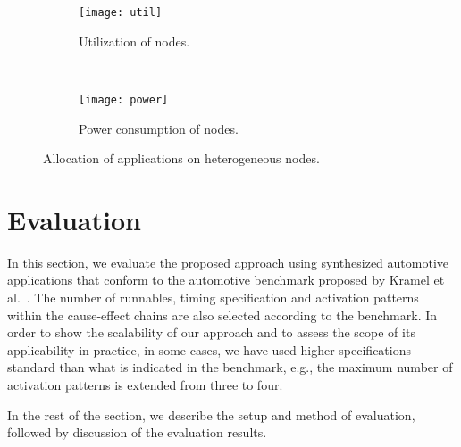 \begin{figure*}
    \centering
    \begin{subfigure}[b]{0.4  \textwidth}
        \texttt{[image: util]}
        \caption{Utilization of nodes.}
        \label{fig_util}
    \end{subfigure}
    ~%
        \begin{subfigure}[b]{0.4\textwidth}
        \texttt{[image: power]}
        \caption{Power consumption of nodes.}
        \label{fig_power}
    \end{subfigure}
    \caption{Allocation of applications on heterogeneous nodes.}
    \label{fig_util_power}
\end{figure*}
\section{Evaluation}\label{sec_evaluation}
In this section, we evaluate the proposed approach using  synthesized automotive applications that conform  to the automotive benchmark proposed by Kramel et al.~\cite{Kramer2015RealFree}. The number of runnables, timing specification and activation patterns within the cause-effect chains are also selected according to the benchmark. In order to show the scalability of our approach and to assess the scope of its applicability in practice, in some cases, we have used higher specifications standard  than what is indicated in the benchmark, e.g., the maximum number of activation patterns is extended from three to four.

In the rest of the section, we describe the setup and method of evaluation, followed by discussion of the evaluation results.

